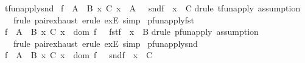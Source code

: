 \begin{isabellebody}
\endisatagproof
{\isafoldproof}%
%
\isadelimproof
\isanewline
%
\endisadelimproof
\isanewline
\isanewline
{}\isamarkupfalse%
\ tfun{\isacharunderscore}apply{\isacharunderscore}snd{\isacharcolon}\isanewline
{\isachardoublequoteopen}{\isacharbrackleft}{\isacharbar}\ f\ {\isacharcolon}\ A\ {\isacharminus}{\isacharminus}{\isacharminus}{\isachargreater}\ B\ {\isacharpercent}x\ C{\isacharsemicolon}\ x\ {\isacharcolon}\ A\ {\isacharbar}{\isacharbrackright}\ {\isacharequal}{\isacharequal}{\isachargreater}\ snd{\isacharparenleft}f\ {\isacharpercent}{\isacharcircum}\ x{\isacharparenright}\ {\isacharcolon}\ C{\isachardoublequoteclose}\isanewline
%
\isadelimproof
%
\endisadelimproof
%
\isatagproof
{}\isamarkupfalse%
{\isacharparenleft}drule\ tfun{\isacharunderscore}apply{\isacharcomma}\ assumption{\isacharparenright}\isanewline
{}\isamarkupfalse%
\ \ \ {\isacharparenleft}frule\ pair{\isacharunderscore}exhaust{\isacharcomma}\ {\isacharparenleft}erule\ exE{\isacharparenright}{\isacharplus}{\isacharcomma}\ simp{\isacharparenright}%
\endisatagproof
{\isafoldproof}%
%
\isadelimproof
\isanewline
%
\endisadelimproof
\isanewline
\isanewline
{}\isamarkupfalse%
\ pfun{\isacharunderscore}apply{\isacharunderscore}fst{\isacharcolon}\isanewline
{\isachardoublequoteopen}{\isacharbrackleft}{\isacharbar}\ f\ {\isacharcolon}\ A\ {\isacharminus}{\isacharbar}{\isacharminus}{\isachargreater}\ B\ {\isacharpercent}x\ C{\isacharsemicolon}\ x\ {\isacharcolon}\ dom\ f\ {\isacharbar}{\isacharbrackright}\ {\isacharequal}{\isacharequal}{\isachargreater}\ fst{\isacharparenleft}f\ {\isacharpercent}{\isacharcircum}\ x{\isacharparenright}\ {\isacharcolon}\ B{\isachardoublequoteclose}\isanewline
%
\isadelimproof
%
\endisadelimproof
%
\isatagproof
{}\isamarkupfalse%
{\isacharparenleft}drule\ pfun{\isacharunderscore}apply{\isacharcomma}\ assumption{\isacharparenright}\isanewline
{}\isamarkupfalse%
\ \ \ {\isacharparenleft}frule\ pair{\isacharunderscore}exhaust{\isacharcomma}\ {\isacharparenleft}erule\ exE{\isacharparenright}{\isacharplus}{\isacharcomma}\ simp{\isacharparenright}%
\endisatagproof
{\isafoldproof}%
%
\isadelimproof
\isanewline
%
\endisadelimproof
\isanewline
\isanewline
{}\isamarkupfalse%
\ pfun{\isacharunderscore}apply{\isacharunderscore}snd{\isacharcolon}\isanewline
{\isachardoublequoteopen}{\isacharbrackleft}{\isacharbar}\ f\ {\isacharcolon}\ A\ {\isacharminus}{\isacharbar}{\isacharminus}{\isachargreater}\ B\ {\isacharpercent}x\ C{\isacharsemicolon}\ x\ {\isacharcolon}\ dom\ f\ {\isacharbar}{\isacharbrackright}\ {\isacharequal}{\isacharequal}{\isachargreater}\ snd{\isacharparenleft}f\ {\isacharpercent}{\isacharcircum}\ x{\isacharparenright}\ {\isacharcolon}\ C{\isachardoublequoteclose}\isanewline

\end{isabellebody}
